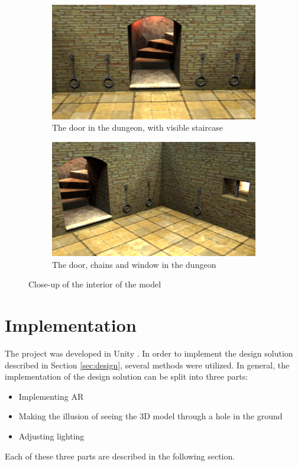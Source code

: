 \begin{figure}[h!]
    \centering
    \begin{subfigure}[h!]{0.7\textwidth}
    	\centering
        \includegraphics[width=\textwidth]{figures/interior0.png}
        \caption{The door in the dungeon, with visible staircase}\label{fig:interior0}
    \end{subfigure}
    \begin{subfigure}[h!]{0.7\textwidth}
    	\centering
        \includegraphics[width=\textwidth]{figures/interior1.png}
        \caption{The door, chains and window in the dungeon}\label{fig:interior1}
    \end{subfigure}
    \caption{Close-up of the interior of the model}\label{interior}
\end{figure}

\section{Implementation} 
The project was developed in Unity \cite{Unity}. In order to implement the design solution described in Section \ref{sec:design}, several methods were utilized. In general, the implementation of the design solution can be split into three parts: 
\begin{itemize}
\item Implementing AR
\item Making the illusion of seeing the 3D model through a hole in the ground
\item Adjusting lighting
\end{itemize}
Each of these three parts are described in the following section. 

